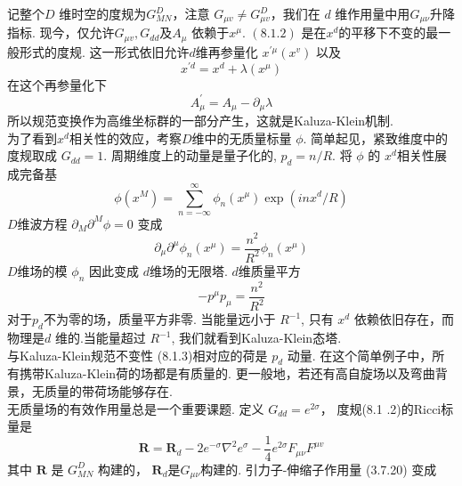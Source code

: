 记整个$D$ 维时空的度规为$G_{M N}^{D} $，注意 $G_{\mu v} \neq G_{\mu v}^{D} $，我们在 $d$ 维作用量中用$G_{\mu \nu} $升降指标. 现今，仅允许$G_{\mu v}, G_{d d}$及$A_{\mu}$ 依赖于$x^{\mu}$.  $(8.1 .2)$ 是在$x^{d}$的平移下不变的最一般形式的度规. 这一形式依旧允许$d$维再参量化 $x^{\prime \mu}\left(x^{v}\right)$ 以及
\begin{equation}
	x^{\prime d}=x^{d}+\lambda\left(x^{\mu}\right)
\end{equation}
在这个再参量化下
\begin{equation}
	A_{\mu}^{\prime}=A_{\mu}-\partial_{\mu} \lambda
\end{equation}
所以规范变换作为高维坐标群的一部分产生，这就是Kaluza-Klein机制.\\
为了看到$x^{d}$相关性的效应，考察$D$维中的无质量标量 $\phi$. 简单起见，紧致维度中的度规取成 $G_{d d}=1$. 周期维度上的动量是量子化的, $p_{d}=n / R$. 将 $\phi$ 的 $x^{d}$相关性展成完备基
\begin{equation}
	\phi\left(x^{M}\right)=\sum_{n=-\infty}^{\infty} \phi_{n}\left(x^{\mu}\right) \exp \left(i n x^{d} / R\right)
\end{equation}
 $D$维波方程 $\partial_{M} \partial^{M} \phi=0$ 变成
\begin{equation}
	\partial_{\mu} \partial^{\mu} \phi_{n}\left(x^{\mu}\right)=\frac{n^{2}}{R^{2}} \phi_{n}\left(x^{\mu}\right)
\end{equation}
$D$维场的模 $\phi_{n}$ 因此变成 $d$维场的无限塔. $d$维质量平方
\begin{equation}
	-p^{\mu} p_{\mu}=\frac{n^{2}}{R^{2}}
\end{equation}
对于$p_{d} $不为零的场，质量平方非零. 当能量远小于 $R^{-1}$, 只有 $x^{d}$ 依赖依旧存在，而物理是$d$ 维的.当能量超过 $R^{-1}$, 我们就看到Kaluza-Klein态塔.\\
与Kaluza-Klein规范不变性 (8.1.3)相对应的荷是 $p_{d}$ 动量. 在这个简单例子中，所有携带Kaluza-Klein荷的场都是有质量的. 更一般地，若还有高自旋场以及弯曲背景，无质量的带荷场能够存在.\\
无质量场的有效作用量总是一个重要课题. 定义 $G_{d d}=e^{2 \sigma} $， 度规(8.1 .2)的Ricci标量是
\begin{equation}
	\boldsymbol{R}=\boldsymbol{R}_{d}-2 e^{-\sigma} \nabla^{2} e^{\sigma}-\frac{1}{4} e^{2 \sigma} F_{\mu \nu} F^{\mu v}
\end{equation}
其中 $\boldsymbol{R}$ 是 $G_{M N}^{D}$ 构建的， $\boldsymbol{R}_{d}$是$G_{\mu \nu} $构建的. 引力子-伸缩子作用量 (3.7.20) 变成
